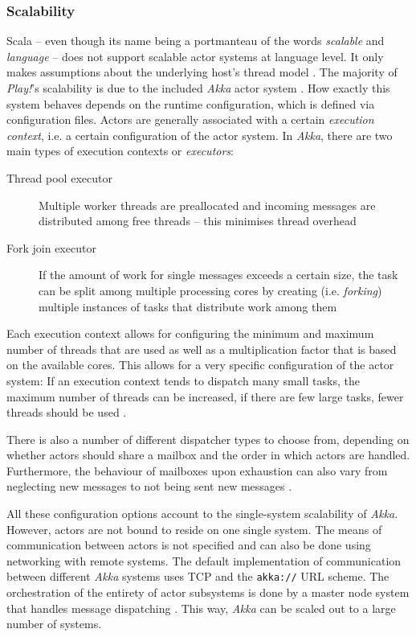 \subsubsection*{Scalability}
Scala -- even though its name being a portmanteau of the words \textit{scalable} and \textit{language} -- does not support scalable actor systems at language level. It only makes assumptions about the underlying host's thread model \cite[p. 3]{Haller2009}. The majority of \textit{Play!}'s scalability is due to the included \textit{Akka} actor system \cite[p. 16]{Gupta2012}. How exactly this system behaves depends on the runtime configuration, which is defined via configuration files. Actors are generally associated with a certain \textit{execution context}, i.e. a certain configuration of the actor system. In \textit{Akka}, there are two main types of execution contexts or \textit{executors}:

\begin{description}
  \item[Thread pool executor] Multiple worker threads are preallocated and incoming messages are distributed among free threads -- this minimises thread overhead
  \item[Fork join executor] If the amount of work for single messages exceeds a certain size, the task can be split among multiple processing cores by creating (i.e. \textit{forking}) multiple instances of tasks that distribute work among them
\end{description}

Each execution context allows for configuring the minimum and maximum number of threads that are used as well as a multiplication factor that is based on the available cores. This allows for a very specific configuration of the actor system: If an execution context tends to dispatch many small tasks, the maximum number of threads can be increased, if there are few large tasks, fewer threads should be used \cite[p. 105]{Gupta2012}.

There is also a number of different dispatcher types to choose from, depending on whether actors should share a mailbox and the order in which actors are handled. Furthermore, the behaviour of mailboxes upon exhaustion can also vary from neglecting new messages to not being sent new messages \cite[p. 104]{Gupta2012}. 

All these configuration options account to the single-system scalability of \textit{Akka}. However, actors are not bound to reside on one single system. The means of communication between actors is not specified and can also be done using networking with remote systems. The default implementation of communication between different \textit{Akka} systems uses TCP and the \texttt{akka://} URL scheme. The orchestration of the entirety of actor subsystems is done by a master node system that handles message dispatching \cite[p. 233]{Gupta2012}. This way, \textit{Akka} can be scaled out to a large number of systems.

